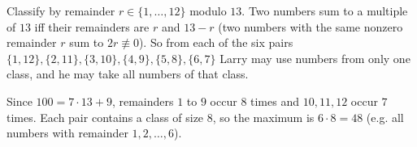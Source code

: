 Classify by remainder $r\in\{1,\dots,12\}$ modulo $13$. Two numbers sum to a multiple of $13$ iff their remainders are $r$ and $13-r$ (two numbers with the same nonzero remainder $r$ sum to $2r\not\equiv0$). So from each of the six pairs $\{1,12\},\{2,11\},\{3,10\},\{4,9\},\{5,8\},\{6,7\}$ Larry may use numbers from only one class, and he may take all numbers of that class.

Since $100=7\cdot13+9$, remainders $1$ to $9$ occur $8$ times and $10,11,12$ occur $7$ times. Each pair contains a class of size $8$, so the maximum is $6\cdot8=\boxed{48}$ (e.g. all numbers with remainder $1,2,\dots,6$).
